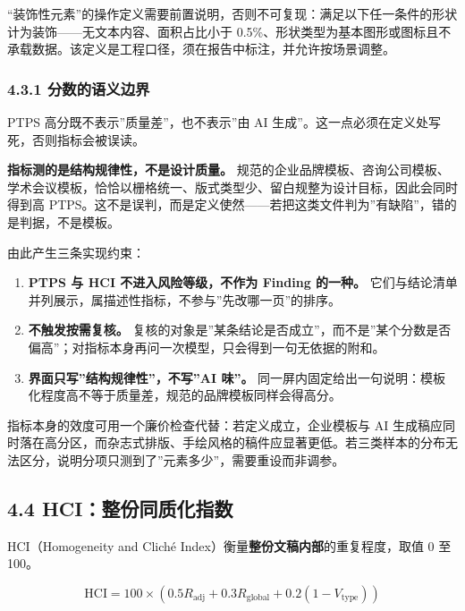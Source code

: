 \documentclass[
  11pt,
]{article}
\providecommand{\tightlist}{%
  \setlength{\itemsep}{0pt}\setlength{\parskip}{0pt}}
\begin{document}
``装饰性元素''的操作定义需要前置说明，否则不可复现：满足以下任一条件的形状计为装饰------无文本内容、面积占比小于
0.5\%、形状类型为基本图形或图标且不承载数据。该定义是工程口径，须在报告中标注，并允许按场景调整。

\subsubsection{4.3.1
分数的语义边界}\label{ux5206ux6570ux7684ux8bedux4e49ux8fb9ux754c}

PTPS 高分既不表示''质量差''，也不表示''由 AI
生成''。这一点必须在定义处写死，否则指标会被误读。

\textbf{指标测的是结构规律性，不是设计质量。}
规范的企业品牌模板、咨询公司模板、学术会议模板，恰恰以栅格统一、版式类型少、留白规整为设计目标，因此会同时得到高
PTPS。这不是误判，而是定义使然------若把这类文件判为''有缺陷''，错的是判据，不是模板。

由此产生三条实现约束：

\begin{enumerate}
\def\labelenumi{\arabic{enumi}.}
\tightlist
\item
  \textbf{PTPS 与 HCI 不进入风险等级，不作为 Finding 的一种。}
  它们与结论清单并列展示，属描述性指标，不参与''先改哪一页''的排序。
\item
  \textbf{不触发按需复核。}
  复核的对象是''某条结论是否成立''，而不是''某个分数是否偏高''；对指标本身再问一次模型，只会得到一句无依据的附和。
\item
  \textbf{界面只写''结构规律性''，不写''AI 味''。}
  同一屏内固定给出一句说明：模板化程度高不等于质量差，规范的品牌模板同样会得高分。
\end{enumerate}

指标本身的效度可用一个廉价检查代替：若定义成立，企业模板与 AI
生成稿应同时落在高分区，而杂志式排版、手绘风格的稿件应显著更低。若三类样本的分布无法区分，说明分项只测到了''元素多少''，需要重设而非调参。

\subsection{4.4
HCI：整份同质化指数}\label{hciux6574ux4efdux540cux8d28ux5316ux6307ux6570}

HCI（Homogeneity and Cliché
Index）衡量\textbf{整份文稿内部}的重复程度，取值 0 至 100。

\[\mathrm{HCI} = 100 \times (0.5R_{\text{adj}} + 0.3R_{\text{global}} + 0.2(1 - V_{\text{type}}))\]
\end{document}
